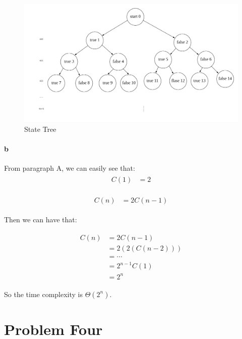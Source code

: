\documentclass[paper=a4, fontsize=11pt]{scrartcl} %
\numberwithin{equation}{section} %
\numberwithin{figure}{section} %
\numberwithin{table}{section} %
\begin{document}
\begin{figure}[htbp!]
		\centering
		\includegraphics[width=1.0\textwidth]{fig1.png}
		\caption{State Tree}%
		\vspace{-1em}
\end{figure}

\paragraph{b} 
From paragraph A, we can easily see that:
\begin{align}
	\begin{split}
		C(1) &= 2
	\end{split}
\end{align}

\begin{align}
	\begin{split}
		C(n) &= 2C(n-1)
	\end{split}
\end{align}

Then we can have that:

\begin{align}
	\begin{split}
		C(n) &= 2C(n-1)\\
		&= 2(2(C(n-2)))\\
		&= \cdots\\
		&= 2^{n-1}C(1)\\
		&= 2^n
	\end{split}
\end{align}

So the time complexity is $\Theta (2^n) $.

\section{Problem Four}
\end{document}
